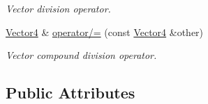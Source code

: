 \begin{DoxyCompactItemize}
\begin{DoxyCompactList}\small\item\em Vector division operator. \end{DoxyCompactList}\item 
\hyperlink{classchaos_1_1gfx_1_1_vector4}{Vector4} \& \hyperlink{classchaos_1_1gfx_1_1_vector4_a106dd26fa45540a0620a0cf494081b47}{operator/=} (const \hyperlink{classchaos_1_1gfx_1_1_vector4}{Vector4} \&other)
\begin{DoxyCompactList}\small\item\em Vector compound division operator. \end{DoxyCompactList}\end{DoxyCompactItemize}
\subsection*{Public Attributes}
